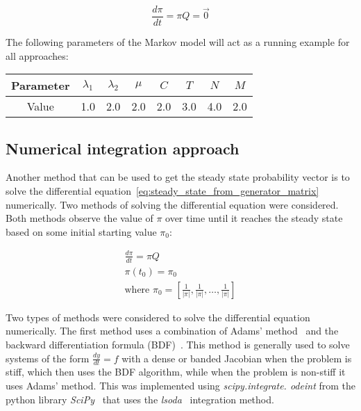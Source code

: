 \begin{equation}\label{eq:steady_state_from_generator_matrix}
    \frac{d\pi}{dt} = \pi Q = \vec{0}
\end{equation}

The following parameters of the Markov model will act as a running example for
all approaches:

\begin{center}
    \begin{tabular}{|c|c|c|c|c|c|c|c|}
        \hline
        Parameter & \(\lambda_1\) & \(\lambda_2\) & \(\mu\) & \(C\) & \(T\)
        & \(N\) & \(M\) \\
        \hline
        Value & 1.0 & 2.0 & 2.0 & 2.0 & 3.0 & 4.0 & 2.0 \\
        \hline
    \end{tabular}
\end{center}


\subsection{Numerical integration approach}

Another method that can be used to get the steady state probability vector is
to solve the differential equation~\eqref{eq:steady_state_from_generator_matrix}
numerically.
Two methods of solving the differential equation were considered.
Both methods observe the value of \(\pi\) over time until it
reaches the steady state based on some initial starting value \(\pi_0\):

\begin{gather}
    \frac{d\pi}{dt} = \pi Q \\
    \pi(t_0) = \pi_0 \nonumber \\
    \text{where } \pi_0 =
    [\frac{1}{|\pi|}, \frac{1}{|\pi|}, \dots, \frac{1}{|\pi|}] \nonumber
\end{gather}

Two types of methods were considered to solve the differential equation
numerically.
The first method uses a combination of Adams' method~\cite{adams_method} and the
backward differentiation formula (BDF)~\cite{backward_differentiation_formula}.
This method is generally used to solve systems of the form
\(\frac{dy}{dt} = f\) with a dense or banded Jacobian when the problem is stiff,
which then uses the BDF algorithm, while when the problem is non-stiff it uses
Adams' method.
This was implemented using \textit{scipy.integrate. odeint} from the python
library \textit{SciPy}~\cite{2020SciPy-NMeth} that uses the
\textit{lsoda}~\cite{lsoda_algorithm} integration method.

